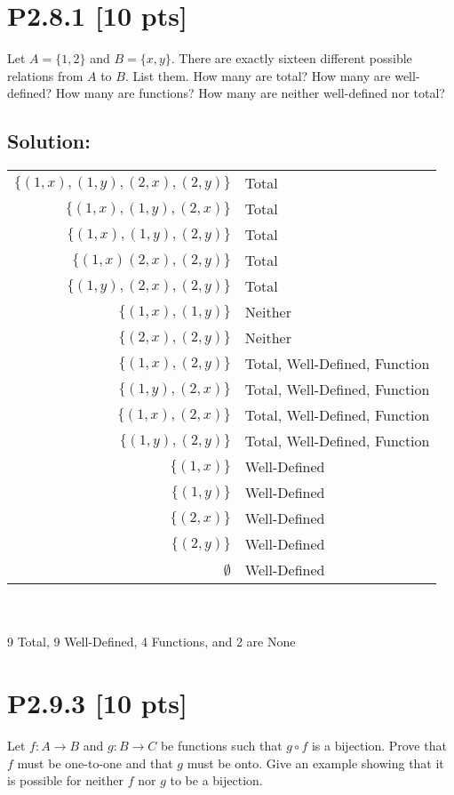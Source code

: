 \documentclass[12pt]{article}
\begin{document}
\newpage
\section*{\textbf{P2.8.1} [10 pts]}
 Let $A = \{1, 2\}$ and $B = \{x, y\}$. There are exactly sixteen different possible relations from $A$ to $B$. List them. How many are total? How many are well-defined? How many are functions? How many are neither well-defined nor total?


\subsection*{\textbf{Solution:}}
\begin{tabular}{r l}
$\{(1,x), (1,y), (2,x), (2,y)\}$ & Total\\
$\{(1,x), (1,y), (2,x)\}$ & Total\\
$\{(1,x), (1,y), (2,y)\}$ & Total\\
$\{(1,x) (2,x), (2,y)\}$ & Total\\
$\{(1,y), (2,x), (2,y)\}$ & Total\\
$\{(1,x), (1,y)\}$ & Neither\\
$\{(2,x), (2,y)\}$ & Neither\\
$\{(1,x), (2,y)\}$ & Total, Well-Defined, Function\\
$\{(1,y), (2,x)\}$ & Total, Well-Defined, Function\\
$\{(1,x), (2,x)\}$ & Total, Well-Defined, Function\\
$\{(1,y), (2,y)\}$ & Total, Well-Defined, Function\\
$\{(1,x)\}$ & Well-Defined\\
$\{(1,y)\}$ & Well-Defined\\
$\{(2,x)\}$ & Well-Defined\\
$\{(2,y)\}$ & Well-Defined\\
$\emptyset$ & Well-Defined
\end{tabular}
\\\\ 9 Total, 9 Well-Defined, 4 Functions, and 2 are None



\newpage
\section*{\textbf{P2.9.3} [10 pts]}
Let $f : A \rightarrow B$ and $g : B \rightarrow C$ be functions such that $g \circ f$ is a bijection. Prove that $f$ must be one-to-one and that $g$ must be onto. Give an example showing that it is possible for neither $f$ nor $g$ to be a bijection.
\end{document}
